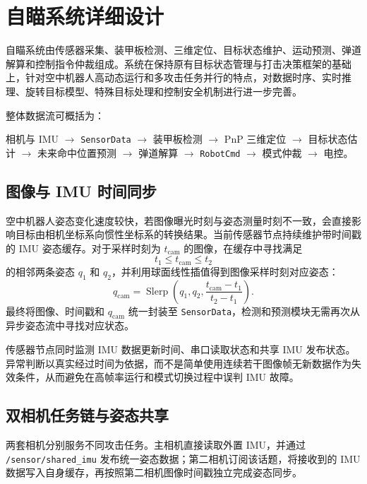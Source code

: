 \section{自瞄系统详细设计}

自瞄系统由传感器采集、装甲板检测、三维定位、目标状态维护、运动预测、弹道解算和控制指令仲裁组成。系统在保持原有目标状态管理与打击决策框架的基础上，针对空中机器人高动态运行和多攻击任务并行的特点，对数据时序、实时推理、旋转目标模型、特殊目标处理和控制安全机制进行进一步完善。

整体数据流可概括为：
\begin{center}
    相机与 IMU $\rightarrow$ \lstinline{SensorData}
    $\rightarrow$ 装甲板检测
    $\rightarrow$ PnP 三维定位
    $\rightarrow$ 目标状态估计
    $\rightarrow$ 未来命中位置预测
    $\rightarrow$ 弹道解算
    $\rightarrow$ \lstinline{RobotCmd}
    $\rightarrow$ 模式仲裁
    $\rightarrow$ 电控。
\end{center}

\subsection{图像与 IMU 时间同步}
空中机器人姿态变化速度较快，若图像曝光时刻与姿态测量时刻不一致，会直接影响目标由相机坐标系向惯性坐标系的转换结果。当前传感器节点持续维护带时间戳的 IMU 姿态缓存。对于采样时刻为 $t_{\mathrm{cam}}$ 的图像，在缓存中寻找满足
\begin{equation}
    t_1 \le t_{\mathrm{cam}} \le t_2
\end{equation}
的相邻两条姿态 $q_1$ 和 $q_2$，并利用球面线性插值得到图像采样时刻对应姿态：
\begin{equation}
    q_{\mathrm{cam}} = \operatorname{Slerp}\left(
        q_1, q_2,
        \frac{t_{\mathrm{cam}}-t_1}{t_2-t_1}
    \right).
\end{equation}
最终将图像、时间戳和 $q_{\mathrm{cam}}$ 统一封装至 \lstinline{SensorData}，检测和预测模块无需再次从异步姿态流中寻找对应状态。

传感器节点同时监测 IMU 数据更新时间、串口读取状态和共享 IMU 发布状态。异常判断以真实经过时间为依据，而不是简单使用连续若干图像帧无新数据作为失效条件，从而避免在高帧率运行和模式切换过程中误判 IMU 故障。

\subsection{双相机任务链与姿态共享}
两套相机分别服务不同攻击任务。主相机直接读取外置 IMU，并通过 \lstinline{/sensor/shared_imu} 发布统一姿态数据；第二相机订阅该话题，将接收到的 IMU 数据写入自身缓存，再按照第二相机图像时间戳独立完成姿态同步。

